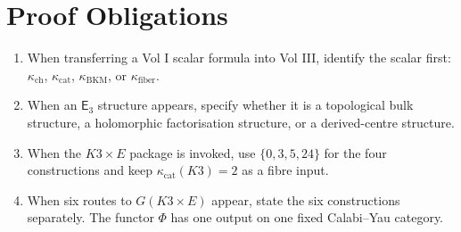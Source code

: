 \documentclass[11pt]{article}
\providecommand{\Ethree}{\mathsf{E}_3}
\providecommand{\kch}{\kappa_{\mathrm{ch}}}
\providecommand{\kcat}{\kappa_{\mathrm{cat}}}
\providecommand{\kBKM}{\kappa_{\mathrm{BKM}}}
\providecommand{\kfib}{\kappa_{\mathrm{fiber}}}
\begin{document}
\section{Proof Obligations}
\label{sec:proof-obligations}

\begin{enumerate}
\item When transferring a Vol I scalar formula into Vol III, identify
the scalar first: $\kch$, $\kcat$, $\kBKM$, or $\kfib$.
\item When an $\Ethree$ structure appears, specify whether it is a
topological bulk structure, a holomorphic factorisation structure, or a
derived-centre structure.
\item When the $K3\times E$ package is invoked, use
$\{0,3,5,24\}$ for the four constructions and keep $\kcat(K3)=2$ as a
fibre input.
\item When six routes to $G(K3\times E)$ appear, state the six
constructions separately. The functor $\Phi$ has one output on one fixed
Calabi--Yau category.
\end{enumerate}
\end{document}
